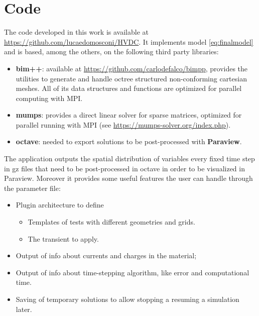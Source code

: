 \documentclass[11pt,a4paper]{article}
\begin{document}
\section{Code}
The code developed in this work is available at \url{https://github.com/lucaedomosconi/HVDC}. It implements model \eqref{eq:finalmodel} and is based, among the others, on the following third party libraries:
\begin{itemize}
	\item \textbf{bim++}: available at \url{https://github.com/carlodefalco/bimpp}, provides the utilities to generate and handle octree structured non-conforming cartesian meshes. All of its data structures and functions are optimized for parallel computing with MPI.
	\item \textbf{mumps}: provides a direct linear solver for sparse matrices, optimized for parallel running with MPI (see \url{https://mumps-solver.org/index.php}).
	\item \textbf{octave}: needed to export solutions to be post-processed with \textbf{Paraview}.
\end{itemize}
The application outputs the spatial distribution of variables every fixed time step in gz files that need to be post-processed in octave in order to be visualized in Paraview. Moreover it provides some useful features the user can handle through the parameter file:
\begin{itemize}
	\item Plugin architecture to define
	\begin{itemize}
		\item Templates of tests with different geometries and grids.
		\item The transient to apply.
	\end{itemize}
	\item Output of info about currents and charges in the material;
	\item Output of info about time-stepping algorithm, like error and computational time.
	\item Saving of temporary solutions to allow stopping a resuming a simulation later.
\end{itemize}
\end{document}
